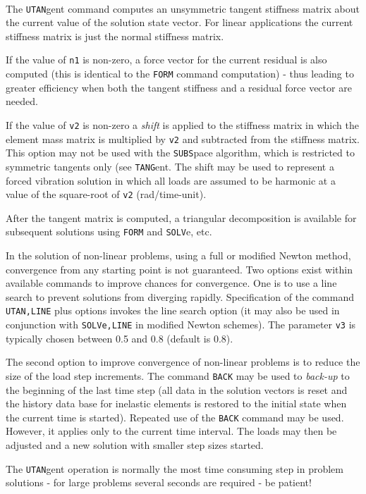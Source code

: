 \\{\smallskip}
\headb

The {\tt UTAN}gent command computes an unsymmetric tangent stiffness matrix
about the current value of the solution state vector.  For
linear applications the current stiffness matrix is just the
normal stiffness matrix.

If the value of {\tt n1} is non-zero, a force vector for
the current residual is also computed (this is identical to
the {\tt FORM} command computation) - thus leading to greater
efficiency when both the tangent stiffness and a residual
force vector are needed.

If the value of {\tt v2} is non-zero a {\it shift} is applied
to the stiffness matrix in which the element mass matrix is
multiplied by {\tt v2} and subtracted from the stiffness matrix.
This option may not be used with the {\tt SUBS}pace algorithm,
which is restricted to symmetric tangents only (see {\tt TANG}ent.
The shift may be used to represent a forced vibration
solution in which all loads are assumed to be harmonic
at a value of the square-root of {\tt v2} (rad/time-unit).

After the tangent matrix is computed, a triangular
decomposition is available for subsequent solutions using
{\tt FORM} and {\tt SOLV}e, etc.

In the solution of non-linear problems, using a full or
modified Newton method, convergence from any starting point
is not guaranteed.  Two options exist within available
commands to improve chances for convergence.  One is to use
a line search to prevent solutions from diverging rapidly.
Specification of the command {\tt UTAN,LINE} plus options
invokes the line search option (it may also be used in conjunction
with {\tt SOLVe,LINE} in modified Newton schemes).  The
parameter {\tt v3} is typically chosen between 0.5 and 0.8
(default is 0.8).

The second option to improve convergence of non-linear
problems is to reduce the size of the load step increments.
The command {\tt BACK} may be used to {\it back-up} to the
beginning of the last time step (all data in the solution
vectors is reset and the history data base for inelastic
elements is restored to the initial state when the current
time is started). Repeated use of the {\tt BACK} command may be
used. However, it applies only to the current time interval.
The loads may then be adjusted and a new solution with
smaller step sizes started.

The {\tt UTAN}gent operation is normally the most time consuming
step in problem solutions - for large problems several
seconds are required - be patient!
\vfill\eject

